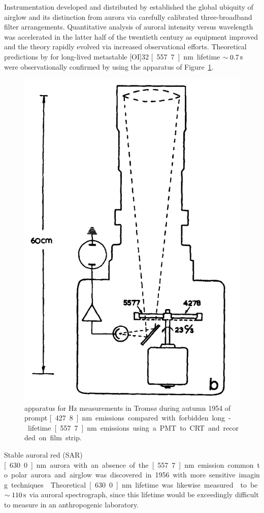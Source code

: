 Instrumentation developed and distributed by \citet{rayleigh1924} established the global ubiquity of airglow and its distinction from aurora via carefully calibrated three-broadband filter arrangements.
Quantitative analysis of auroral intensity versus wavelength was accelerated in the latter half of the twentieth century \citep{seaton1954} as equipment improved and the theory rapidly evolved via increased observational efforts.
Theoretical predictions by \citet{garstang1951} for long-lived metastable [OI]32 \unit[557.7]{nm} lifetime $\sim \unit[0.7]{s}$ were observationally confirmed by \citet{omholt1955} using the apparatus of Figure~\ref{fig:omholtpmt}.
\begin{figure}\centering
    \includegraphics[width=0.6\linewidth]{gfx/omholtpmt}
    \caption{\citet{omholt1955} apparatus for \unit[23]{Hz} measurements in Tromsø during autumn 1954 of prompt \unit[427.8]{nm} emissions compared with forbidden long-lifetime \unit[557.7]{nm} emissions using a PMT to CRT and recorded on film strip.}\label{fig:omholtpmt}
\end{figure}
Stable auroral red (SAR) \unit[630.0]{nm} aurora with an absence of the \unit[557.7]{nm} emission common to polar aurora and airglow was discovered in 1956 with more sensitive imaging techniques \citep{baumgardner2007}.
Theoretical \unit[630.0]{nm} lifetime was likewise measured \citep{stoffregen1960} to be $\sim \unit[110]{s}$ via auroral spectrograph, since this lifetime would be exceedingly difficult to measure in an anthropogenic laboratory.
